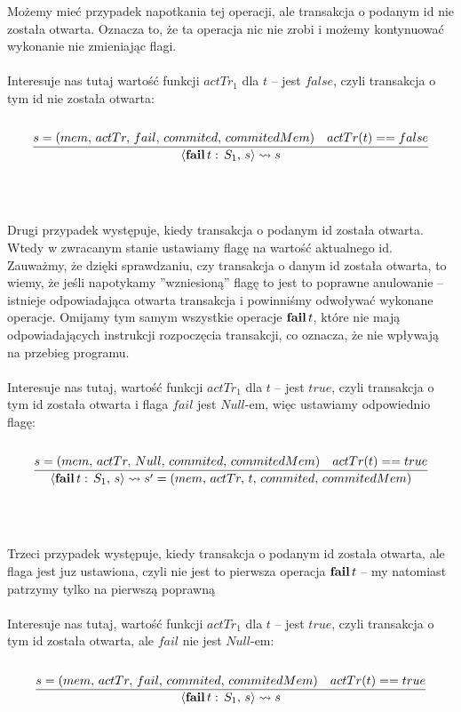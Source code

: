 \documentclass{article}
\begin{document}
\begin{itemize}
      Możemy mieć przypadek napotkania tej operacji, ale transakcja o podanym id nie została otwarta.
      Oznacza to, że ta operacja nic nie zrobi i możemy kontynuować wykonanie nie zmieniając flagi.
      \\ \\
      Interesuje nas tutaj wartość funkcji $actTr_1$ dla $t$ -- jest $false$, czyli transakcja o tym id nie została otwarta:
      \\ \\
      \[
         \frac {
            s = (mem, \, actTr, \, fail, \, commited, \, commitedMem)
            \quad
            actTr(t) == false
         } {
            \langle {\bf fail} \, t: \, S_1, \, s \rangle
            \leadsto s
         }
      \]
      \\ \\ \\
      Drugi przypadek występuje, kiedy transakcja o podanym id została otwarta.
      Wtedy w zwracanym stanie ustawiamy flagę na wartość aktualnego id.
      Zauważmy, że dzięki sprawdzaniu, czy transakcja o danym id została otwarta, to wiemy,
      że jeśli napotykamy ''wzniesioną'' flagę to jest to poprawne anulowanie
      -- istnieje odpowiadająca otwarta transakcja i powinniśmy odwoływać wykonane operacje.
      Omijamy tym samym wszystkie operacje ${\bf fail} \, t$, które nie mają odpowiadających instrukcji rozpoczęcia
      transakcji, co oznacza, że nie wpływają na przebieg programu.
      \\ \\
      Interesuje nas tutaj, wartość funkcji $actTr_1$ dla $t$ -- jest $true$, czyli transakcja o tym id została otwarta
      i flaga $fail$ jest $Null$-em, więc ustawiamy odpowiednio flagę:
      \\ \\
      \[
         \frac {
            s = (mem, \, actTr, \, Null, \, commited, \, commitedMem)
            \quad
            actTr(t) == true
         } {
            \langle {\bf fail} \, t: \, S_1, \, s \rangle
            \leadsto s' = (mem, \, actTr, \, t, \, commited, \, commitedMem)
         }
      \]
      \\ \\ \\
      Trzeci przypadek występuje, kiedy transakcja o podanym id została otwarta,
      ale flaga jest juz ustawiona, czyli nie jest to pierwsza operacja ${\bf fail} \, t$
      -- my natomiast patrzymy tylko na pierwszą poprawną
      \\ \\
      Interesuje nas tutaj, wartość funkcji $actTr_1$ dla $t$ -- jest $true$, czyli transakcja o tym id została otwarta,
      ale $fail$ nie jest $Null$-em:
      \\ \\
      \[
         \frac {
            s = (mem, \, actTr, \, fail, \, commited, \, commitedMem)
            \quad
            actTr(t) == true
         } {
            \langle {\bf fail} \, t: \, S_1, \, s \rangle
            \leadsto s
         }
      \]
      \\ \\ \\


\end{itemize}
\end{document}
